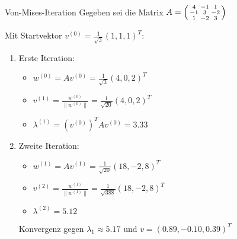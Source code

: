 \begin{example2}{Von-Mises-Iteration}
Gegeben sei die Matrix
$A = \begin{psmallmatrix} 
4 & -1 & 1 \\
-1 & 3 & -2 \\
1 & -2 & 3
\end{psmallmatrix}$

Mit Startvektor $v^{(0)} = \frac{1}{\sqrt{3}}(1,1,1)^T$:

\begin{enumerate}
    \item Erste Iteration:
    \begin{itemize}
        \item $w^{(0)} = Av^{(0)} = \frac{1}{\sqrt{3}}(4,0,2)^T$
        \item $v^{(1)} = \frac{w^{(0)}}{\|w^{(0)}\|} = \frac{1}{\sqrt{20}}(4,0,2)^T$
        \item $\lambda^{(1)} = (v^{(0)})^TAv^{(0)} = 3.33$
    \end{itemize}

    \item Zweite Iteration:
    \begin{itemize}
        \item $w^{(1)} = Av^{(1)} = \frac{1}{\sqrt{20}}(18,-2,8)^T$
        \item $v^{(2)} = \frac{w^{(1)}}{\|w^{(1)}\|} = \frac{1}{\sqrt{388}}(18,-2,8)^T$
        \item $\lambda^{(2)} = 5.12$
    \end{itemize}

Konvergenz gegen $\lambda_1 \approx 5.17$ und $v = (0.89, -0.10, 0.39)^T$
\end{enumerate}
\end{example2}

